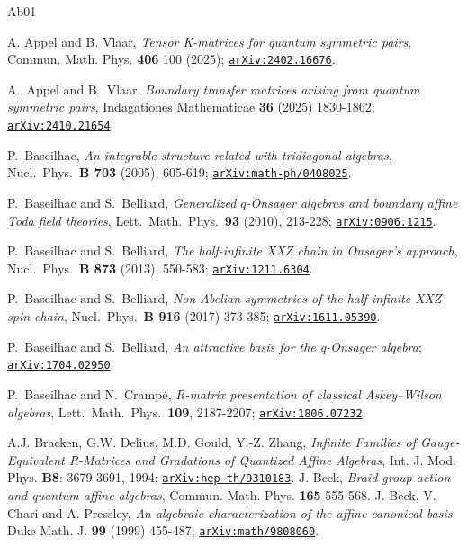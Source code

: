\documentclass[11pt]{amsart}
\numberwithin{equation}{section}
\numberwithin{equation}{section}
\begin{document}
\begin{appendix}
\end{appendix}
	
\begin{thebibliography}{Ab01}	

A. Appel and B. Vlaar, {\it Tensor K-matrices for quantum symmetric pairs}, Commun. Math. Phys. {\bf 406} 100 (2025);  \href{https://arxiv.org/abs/2402.16676
}{\tt arXiv:2402.16676}.

A.\ Appel and B.\ Vlaar,  {\it Boundary transfer matrices arising from quantum symmetric pairs},  
Indagationes Mathematicae {\bf 36} (2025) 1830-1862; \href{https://arxiv.org/abs/2410.21654}{\tt arXiv:2410.21654}.


	 P.\ Baseilhac, {\it An integrable structure related with tridiagonal algebras}, Nucl.\ Phys.\ {\bf B 703} (2005), 605-619;   \href{https://arxiv.org/abs/math-ph/0408025}{\tt arXiv:math-ph/0408025}.
	
	

P.\ Baseilhac and S.\ Belliard, {\it Generalized $q$-Onsager algebras and boundary affine Toda field theories}, Lett.\ Math.\ Phys.\ {\bf 93} (2010), 213-228; \href{https://arxiv.org/abs/0906.1215} {\tt arXiv:0906.1215}.

 P.\ Baseilhac and S.\ Belliard, \textit{The half-infinite XXZ chain in
	Onsager's approach}, Nucl.\ Phys.\ {\bf B 873} (2013), 550-583; \href{https://arxiv.org/abs/1211.6304}{\tt arXiv:1211.6304}.


P.\ Baseilhac and S.\ Belliard, {\it Non-Abelian symmetries of the half-infinite XXZ spin chain}, Nucl.\ Phys.\ {\bf B 916} (2017) 373-385; \href{https://arxiv.org/abs/1611.05390} {\tt arXiv:1611.05390}.

P.\ Baseilhac and S.\ Belliard, \textit{An attractive basis for the q-Onsager algebra}; \href{https://arxiv.org/abs/1704.02950}{\tt arXiv:1704.02950}.

P.\ Baseilhac and N.\ Crampé, \textit{R-matrix presentation of classical Askey–Wilson algebras}, Lett.\ Math.\ Phys.\ {\bf 109}, 2187-2207; \href{https://arxiv.org/abs/1806.07232}{\tt arXiv:1806.07232}.


A.J. Bracken, G.W. Delius, M.D. Gould, Y.-Z. Zhang,
\textit{Infinite Families of Gauge-Equivalent R-Matrices and Gradations of Quantized Affine Algebras},
Int. J. Mod. Phys. {\bf B8}: 3679-3691, 1994; \href{https://arxiv.org/abs/hep-th/9310183}{\tt arXiv:hep-th/9310183}.
%
J. Beck, {\it Braid group action and quantum affine algebras}, Commun. Math. Phys. {\bf 165} 555-568.
%
J. Beck, V. Chari and A. Pressley, {\it An algebraic characterization of the affine canonical basis}
Duke Math. J. {\bf 99} (1999) 455-487; \href{https://arxiv.org/abs/math/9808060}{\tt arXiv:math/9808060}.
%


\end{thebibliography}
\end{document}
